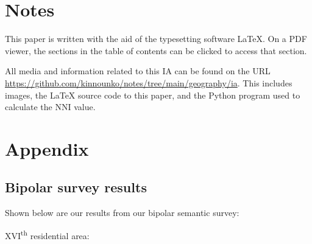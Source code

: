 \documentclass[11pt,letterpaper]{article}
\begin{document}
\section*{Notes}
\label{sec:notes}

This paper is written with the aid of the typesetting software \LaTeX. On a PDF viewer, the sections in the table of contents can be clicked to access that section.

All media and information related to this IA can be found on the URL \url{https://github.com/kinnounko/notes/tree/main/geography/ia}. This includes images, the \LaTeX{} source code to this paper, and the Python program used to calculate the NNI value.

\printbibliography

\appendix
\section{Appendix}
\label{app}

\subsection{Bipolar survey results}
\label{app:bipolar}

Shown below are our results from our bipolar semantic survey:

XVI\textsuperscript{th} residential area:
\end{document}

